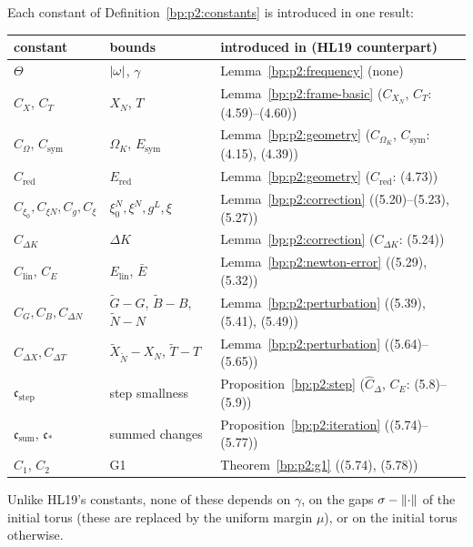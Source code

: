\begin{remark}\label{bp:p2:constants-register}
Each constant of Definition~\ref{bp:p2:constants} is introduced in one result:
\begin{center}\small
\begin{tabular}{lll}
constant & bounds & introduced in (HL19 counterpart)\\\hline
$\Theta$ & $\lvert \omega\rvert$, $\gamma$ & Lemma~\ref{bp:p2:frequency} (none)\\
$C_X$, $C_T$ & $X_N$, $T$ & Lemma~\ref{bp:p2:frame-basic} ($C_{X_N}$, $C_T$: (4.59)--(4.60))\\
$C_\Omega$, $C_{\mathrm{sym}}$ & $\Omega_K$, $E_{\mathrm{sym}}$ & Lemma~\ref{bp:p2:geometry} ($C_{\Omega_K}$,
  $C_{\mathrm{sym}}$: (4.15), (4.39))\\
$C_{\mathrm{red}}$ & $E_{\mathrm{red}}$ & Lemma~\ref{bp:p2:geometry} ($C_{\mathrm{red}}$: (4.73))\\
$C_{\xi_0},C_{\xi N},C_g,C_\xi$ & $\xi^N_0,\xi^N,g^L,\xi$ & Lemma~\ref{bp:p2:correction}
  ((5.20)--(5.23), (5.27))\\
$C_{\Delta K}$ & $\Delta K$ & Lemma~\ref{bp:p2:correction} ($C_{\Delta K}$: (5.24))\\
$C_{\mathrm{lin}}$, $C_E$ & $E_{\mathrm{lin}}$, $\bar E$ & Lemma~\ref{bp:p2:newton-error} ((5.29),
  (5.32))\\
$C_G,C_B,C_{\Delta N}$ & $\tilde G-G$, $\tilde B-B$, $\tilde N-N$ & Lemma~\ref{bp:p2:perturbation}
  ((5.39), (5.41), (5.49))\\
$C_{\Delta X},C_{\Delta T}$ & $\tilde X_{\tilde N}-X_N$, $\tilde T-T$ & Lemma~\ref{bp:p2:perturbation}
  ((5.64)--(5.65))\\
$\mathfrak c_{\mathrm{step}}$ & step smallness & Proposition~\ref{bp:p2:step} ($\hat C_\Delta$, $C_E$: (5.8)--(5.9))\\
$\mathfrak c_{\mathrm{sum}}$, $\mathfrak c_*$ & summed changes & Proposition~\ref{bp:p2:iteration}
  ((5.74)--(5.77))\\
$C_1$, $C_2$ & G1 & Theorem~\ref{bp:p2:g1} ((5.74), (5.78))
\end{tabular}
\end{center}
Unlike HL19's constants, none of these depends on $\gamma$, on the gaps $\sigma-\lVert \cdot\rVert$ of the
initial torus (these are replaced by the uniform margin $\mu$), or on the initial torus otherwise.
\end{remark}

